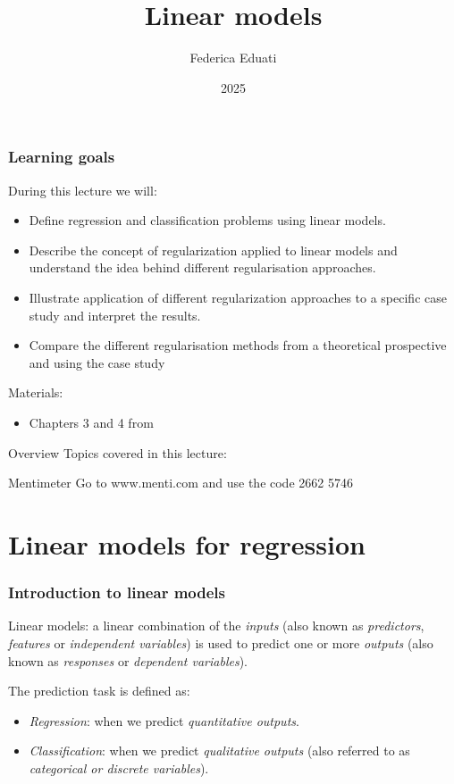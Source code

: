 \documentclass[notes]{beamer}          %
\title{Linear models}
\author{Federica Eduati}
\institute{Eindhoven University of Technology

Department of Biomedical Engineering}
\date{2025}
\begin{document}
 
\frame{\titlepage}
 
\begin{frame}
\frametitle{Learning goals}

During this lecture we will:
\begin{itemize}
	\item Define regression and classification problems using linear models.   
    \item Describe the concept of regularization applied to linear models and understand the idea behind different regularisation approaches. 
    \item Illustrate application of different regularization approaches to a specific case study and interpret the results.
    \item Compare the different regularisation methods from a theoretical prospective and using the case study
\end{itemize}

\vspace{5mm} 

Materials: 
\begin{itemize}
    \item Chapters 3 and 4 from \cite{elements}
\end{itemize}

\end{frame}


\begin{frame}{Overview}
Topics covered in this lecture:
    \tableofcontents
\end{frame}

\begin{frame}{Mentimeter}
Go to www.menti.com and use the code 2662 5746
\end{frame}



\section{Linear models for regression}


\begin{frame}
\frametitle{Introduction to linear models}
Linear models: a linear combination of the \textit{inputs} (also known as \textit{predictors}, \textit{features} or \textit{independent variables}) is used to predict one or more \textit{outputs} (also known as \textit{responses} or \textit{dependent variables}).

\vspace{5mm} 

The prediction task is defined as:
\begin{itemize}
    \item \textit{Regression}: when we predict \textit{quantitative outputs}.
    \item \textit{Classification}: when we predict \textit{qualitative outputs} (also referred to as \textit{categorical or discrete variables}).
\end{itemize}

\end{frame}
\end{document}
